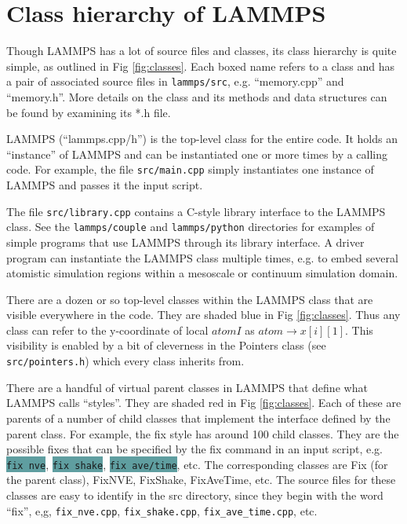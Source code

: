 \documentclass{article}
\newcommand{\path}[1]{\colorbox{light-gray}{\texttt{#1}}}
\newcommand{\code}[1]{\colorbox{cadetblue}{\color{white}\texttt{#1}}}
\begin{document}
\pagebreak
\section{Class hierarchy of LAMMPS}

Though LAMMPS has a lot of source files and classes, its class
hierarchy is quite simple, as outlined in Fig \ref{fig:classes}.  Each
boxed name refers to a class and has a pair of associated source files
in \path{lammps/src}, e.g. ``memory.cpp'' and ``memory.h''.  More details on the
class and its methods and data structures can be found by examining
its *.h file.

LAMMPS (``lammps.cpp/h'') is the top-level class for the entire code.  It
holds an ``instance'' of LAMMPS and can be instantiated one or more
times by a calling code.  For example, the file \path{src/main.cpp} simply
instantiates one instance of LAMMPS and passes it the input script.

The file \path{src/library.cpp} contains a C-style library interface to the
LAMMPS class.  See the \path{lammps/couple} and \path{lammps/python} directories for
examples of simple programs that use LAMMPS through its library
interface.  A driver program can instantiate the LAMMPS class multiple
times, e.g. to embed several atomistic simulation regions within a
mesoscale or continuum simulation domain.

There are a dozen or so top-level classes within the LAMMPS class that
are visible everywhere in the code.  They are shaded blue in Fig
\ref{fig:classes}.  Thus any class can refer to the y-coordinate of
local $atom I$ as $atom \rightarrow x[i][1]$.  This visibility is
enabled by a bit of cleverness in the Pointers class (see
\path{src/pointers.h}) which every class inherits from.

There are a handful of virtual parent classes in LAMMPS that define what LAMMPS
calls ``styles''. They are shaded red in Fig \ref{fig:classes}. Each of these
are parents of a number of child classes that implement the interface defined by
the parent class. For example, the fix style has around 100 child classes. They
are the possible fixes that can be specified by the fix command in an input
script, e.g. \code{fix nve}, \code{fix shake}, \code{fix ave/time}, etc. The
corresponding classes are Fix (for the parent class), FixNVE, FixShake,
FixAveTime, etc. The source files for these classes are easy to identify in the
src directory, since they begin with the word ``fix'', e,g, \path{fix\_nve.cpp},
\path{fix\_shake.cpp}, \path{fix\_ave\_time.cpp}, etc.
\end{document}
